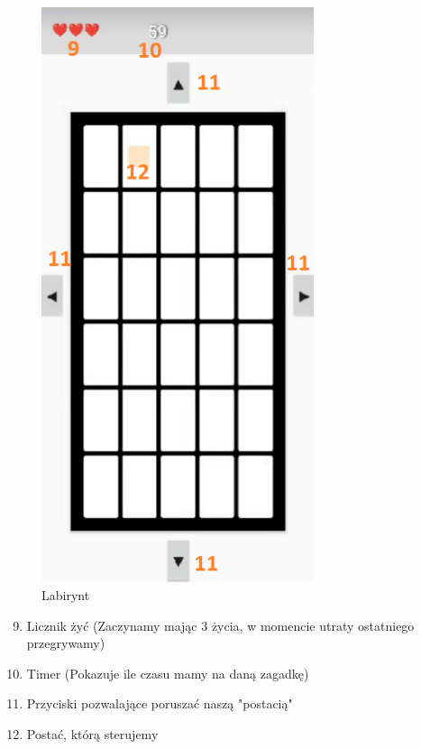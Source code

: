 	\begin{figure}[!htb]
	\begin{center}
		\includegraphics[width=8cm]{rys/opis4.png}
		\caption{Labirynt}
		\label{rys:rysunek001}
	\end{center}
\end{figure}

\begin{enumerate}
	\setcounter{enumi}{8}
	\item Licznik żyć (Zaczynamy mając 3 życia, w momencie utraty ostatniego przegrywamy)
	\item Timer (Pokazuje ile czasu mamy na daną zagadkę)
	\item Przyciski pozwalające poruszać naszą "postacią"
	\item Postać, którą sterujemy
\end{enumerate}